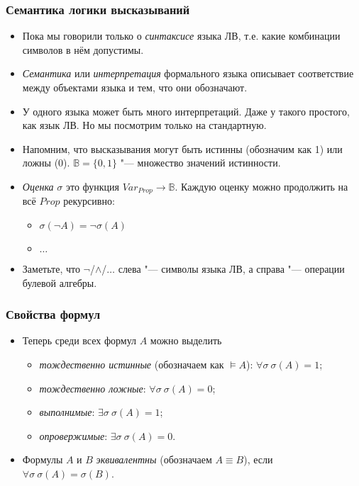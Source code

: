 \documentclass[10pt]{beamer}
\begin{document}
\begin{frame}
    \frametitle{Семантика логики высказываний}
    \begin{itemize}
        \item Пока мы говорили только о \emph{синтаксисе} языка ЛВ, т.е. какие комбинации символов в нём допустимы.
        \item \emph{Семантика} или \emph{интерпретация} формального языка описывает соответствие между объектами языка и тем, что они обозначают.
        \item У одного языка может быть много интерпретаций. Даже у такого простого, как язык ЛВ. Но мы посмотрим только на стандартную.
        \item Напомним, что высказывания могут быть истинны (обозначим как 1) или ложны (0). $\mathbb{B} = \{0, 1\}$ "--- множество значений истинности.
        \item \emph{Оценка} $\sigma$ это функция $Var_{Prop} \to \mathbb{B}$. Каждую оценку можно продолжить на всё $Prop$ рекурсивно:
        \begin{itemize}
            \item $\sigma(\neg A) = \neg \sigma(A)$
            \item $\ldots$
        \end{itemize}
        \item Заметьте, что $\neg$/$\land$/$\ldots$ слева "--- символы языка ЛВ, а справа "--- операции булевой алгебры.
    \end{itemize}
\end{frame}

\begin{frame}
    \frametitle{Свойства формул}
    \begin{itemize}
        \item Теперь среди всех формул $A$ можно выделить
        \begin{itemize}
            \item \emph{тождественно истинные} (обозначаем как $\vDash A$): $\forall \sigma ~ \sigma(A) = 1$;
            \item \emph{тождественно ложные}: $\forall \sigma ~ \sigma(A) = 0$;
            \item \emph{выполнимые}: $\exists \sigma ~ \sigma(A) = 1$;
            \item \emph{опровержимые}: $\exists \sigma ~ \sigma(A) = 0$.
        \end{itemize}
        \pause
        \item Формулы $A$ и $B$ \emph{эквивалентны} (обозначаем $A \equiv B$), если $\forall \sigma ~ \sigma(A) = \sigma(B)$.
    \end{itemize}
\end{frame}
\end{document}
